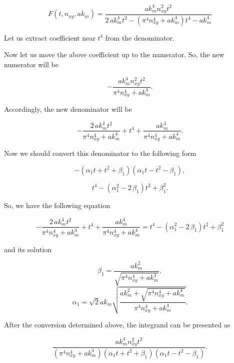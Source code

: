 \documentclass[twoside, 10pt]{article}
\begin{document}
\begin{multicols}{2}
\[F\left(t, n_{xy}, ak_m\right) = \frac{\mathit{ak}_{m}^{4} n_{\mathit{xy}}^{2} t^{2}}{2 \, \mathit{ak}_{m}^{4} t^{2} - {\left(\pi^{4} n_{\mathit{xy}}^{4} + \mathit{ak}_{m}^{4}\right)} t^{4} - \mathit{ak}_{m}^{4}}\]

    Let us extract coefficient near \(t^4\) from the denominator.

    Now let us move the above coefficient up to the numerator. So, the new
numerator will be

    \[-\frac{\mathit{ak}_{m}^{4} n_{\mathit{xy}}^{2} t^{2}}{\pi^{4} n_{\mathit{xy}}^{4} + \mathit{ak}_{m}^{4}}.\]

    Accordingly, the new denominator will be

    \[-\frac{2 \, \mathit{ak}_{m}^{4} t^{2}}{\pi^{4} n_{\mathit{xy}}^{4} + \mathit{ak}_{m}^{4}} + t^{4} + \frac{\mathit{ak}_{m}^{4}}{\pi^{4} n_{\mathit{xy}}^{4} + \mathit{ak}_{m}^{4}}.\]

    Now we should convert this denominator to the following form

    \[-{\left(\alpha_{1} t + t^{2} + \beta_{1}\right)} {\left(\alpha_{1} t - t^{2} - \beta_{1}\right)},\]

\[t^{4} - {\left(\alpha_{1}^{2} - 2 \, \beta_{1}\right)} t^{2} + \beta_{1}^{2}.\]


    So, we have the following equation

\[-\frac{2 \, \mathit{ak}_{m}^{4} t^{2}}{\pi^{4} n_{\mathit{xy}}^{4} + \mathit{ak}_{m}^{4}} + t^{4} + \frac{\mathit{ak}_{m}^{4}}{\pi^{4} n_{\mathit{xy}}^{4} + \mathit{ak}_{m}^{4}} = t^{4} - {\left(\alpha_{1}^{2} - 2 \, \beta_{1}\right)} t^{2} + \beta_{1}^{2}\]

and its solution

\begin{equation}\beta_{1} = \frac{\mathit{ak}_{m}^{2}}{\sqrt{\pi^{4} n_{\mathit{xy}}^{4} + \mathit{ak}_{m}^{4}}},\end{equation} \begin{equation}\alpha_{1} = \sqrt{2} \mathit{ak}_{m} \sqrt{\frac{\mathit{ak}_{m}^{2} + \sqrt{\pi^{4} n_{\mathit{xy}}^{4} + \mathit{ak}_{m}^{4}}}{\pi^{4} n_{\mathit{xy}}^{4} + \mathit{ak}_{m}^{4}}}.\end{equation}

    After the conversion determined above, the integrand can be presented as

    \[\frac{\mathit{ak}_{m}^{4} n_{\mathit{xy}}^{2} t^{2}}{{\left(\pi^{4} n_{\mathit{xy}}^{4} + \mathit{ak}_{m}^{4}\right)} {\left(\alpha_{1} t + t^{2} + \beta_{1}\right)} {\left(\alpha_{1} t - t^{2} - \beta_{1}\right)}}.\]


\end{multicols}
\end{document}
